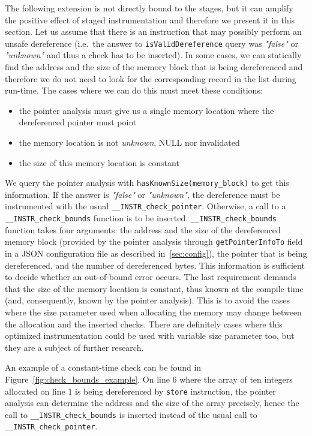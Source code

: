 The following extension is not directly bound to the stages, but it can amplify
the positive effect of staged instrumentation and therefore we present it in
this section. Let us assume that there is an instruction that may possibly
perform an unsafe dereference (i.e.~the answer to \texttt{isValidDereference}
query was \emph{"false"} or \emph{"unknown"} and thus a check has to be
inserted). In some cases, we can statically find the address and the size of
the memory block that is being dereferenced and therefore we do not need to
look for the corresponding record in the list during run-time. The cases where
we can do this must meet these conditions:
\begin{itemize}
\item the pointer analysis must give us a single memory location where the
dereferenced pointer must point
\item the memory location is not \emph{unknown}, NULL nor invalidated
\item the size of this memory location is constant
\end{itemize}

We query the pointer analysis with \texttt{hasKnownSize(memory\_block)}
to get this information.  If the answer is \emph{"false"} or \emph{"unknown"},
the dereference must be instrumented with the usual
\texttt{\_\_INSTR\_check\_pointer}. Otherwise, a call to a
\texttt{\_\_INSTR\_check\_bounds} function is to be inserted.
\texttt{\_\_INSTR\_check\_bounds} function takes four arguments: the address
and the size of the dereferenced memory block (provided by the pointer analysis
through \texttt{getPointerInfoTo} field in a JSON configuration file as
described in~\ref{sec:config}), the pointer that is being dereferenced, and
the number of dereferenced bytes.  This information is sufficient to decide
whether an out-of-bound error occurs.  The last requirement demands that the
size of the memory location is constant, thus known at the compile time (and,
consequently, known by the pointer analysis).  This is to avoid the cases where
the size parameter used when allocating the memory may change between the
allocation and the inserted checks.  There are definitely cases where this
optimized instrumentation could be used with variable size parameter too, but
they are a subject of further research.

An example of a constant-time check can be found in
Figure~\ref{fig:check_bounds_example}. On line 6 where the array of ten
integers allocated on line 1 is being dereferenced by \texttt{store}
instruction, the pointer analysis can determine the address and the size of the
array precisely, hence the call to \texttt{\_\_INSTR\_check\_bounds} is
inserted instead of the usual call to \texttt{\_\_INSTR\_check\_pointer}.

